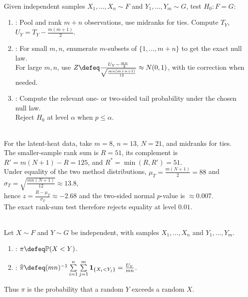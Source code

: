 \begin{method} \label{meth:mann-whitney-test} \\
Given independent samples $X_1,\ldots,X_n\sim F$ and $Y_1,\ldots,Y_m\sim G$, test $H_0:F=G$:
\begin{enumerate}[label=(\roman*)]
\setlength{\itemsep}{0pt}
\item {}: Pool and rank $m+n$ observations, use midranks for ties. Compute $T_Y$, $U_Y=T_Y-\frac{m(m+1)}{2}$.
\item {}: For small $m,n$, enumerate $m$-subsets of $\{1,\ldots,m+n\}$ to get the exact null law.\\
For large $m,n$, use $Z\defeq\frac{U_Y-\frac{mn}{2}}{\sqrt{\frac{mn(m+n+1)}{12}}}\approx N(0,1)$, with tie correction when needed.
\item {}: Compute the relevant one- or two-sided tail probability under the chosen null law.\\
Reject $H_0$ at level $\alpha$ when $p\leq\alpha$.
\end{enumerate}
\end{method}

\begin{example} \label{ex:heat-fusion-mann-whitney} \\
For the latent-heat data, take $m=8$, $n=13$, $N=21$, and midranks for ties.\\
The smaller-sample rank sum is $R=51$, its complement is $R'=m(N+1)-R=125$, and $R^\ast=\min(R,R')=51$.\\
Under equality of the two method distributions, $\mu_T=\frac{m(N+1)}{2}=88$ and $\sigma_T=\sqrt{\frac{mn(N+1)}{12}}\approx13.8$,\\
hence $z=\frac{R-\mu_T}{\sigma_T}\approx-2.68$ and the two-sided normal $p$-value is $\approx0.007$.\\
The exact rank-sum test therefore rejects equality at level $0.01$.
\end{example}

\begin{definition} \label{def:mann-whitney-effect-probability} \\
Let $X\sim F$ and $Y\sim G$ be independent, with samples $X_1,\ldots,X_n$ and $Y_1,\ldots,Y_m$.
\begin{enumerate}[label=(\roman*)]
\setlength{\itemsep}{0pt}
\item {}: $\pi\defeq\mathbb{P}(X<Y)$.
\item {}: $\widehat{\pi}\defeq (mn)^{-1}\sum\limits_{i=1}^n\sum\limits_{j=1}^m\mathbf{1}_{\{X_i<Y_j\}}=\frac{U_Y}{mn}$.
\end{enumerate}
Thus $\pi$ is the probability that a random $Y$ exceeds a random $X$.
\end{definition}

